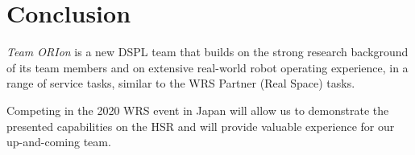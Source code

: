 \documentclass[runningheads,a4paper]{llncs}
\newcommand{\teamori}{Team ORIon}
\begin{document}
\section{Conclusion}
\textit{\teamori{}} is a new DSPL team that builds on the strong research 
background of its team members and on extensive real-world robot operating
experience, in a range of service tasks, similar to the WRS Partner (Real Space) tasks. 

Competing in the 2020 WRS event in Japan will allow us to demonstrate 
the presented capabilities on the HSR and will provide valuable experience
for our up-and-coming team.



\end{document}
